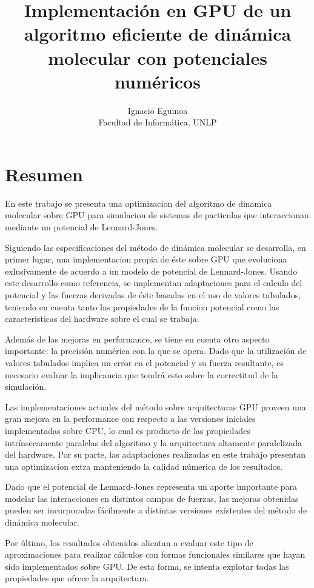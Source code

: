 \documentclass[a4paper,10pt]{report}
\title{Implementación en GPU de un algoritmo eficiente de dinámica molecular con potenciales numéricos}
\author{Ignacio Eguinoa \\ 
\small Facultad de Informática, UNLP
\date{}
}
\begin{document}
\maketitle



\section*{Resumen} 



En este trabajo se presenta una optimizacion del algoritmo de dinamica molecular sobre GPU para simulacion de sistemas de particulas que interaccionan mediante un potencial de Lennard-Jones. 

Siguiendo las especificaciones del método de dinámica molecular se desarrolla, en primer lugar, una implementacion propia de éste sobre GPU que evoluciona exlusivamente de acuerdo a un modelo de potencial de Lennard-Jones. Usando este desarrollo como referencia, se implementan adaptaciones para el calculo del potencial y las fuerzas derivadas de éste basadas en el uso de valores tabulados, teniendo en cuenta tanto las propiedades de la funcion potencial como las caracteristicas del hardware sobre el cual se trabaja.

Además de las mejoras en performance, se tiene en cuenta otro aspecto importante: la precisión numérica con la que se opera. Dado que la utilización de valores tabulados implica un error en el potencial y su fuerza resultante, es necesario evaluar la implicancia que tendrá esto sobre la correctitud de la simulación.

Las implementaciones actuales del método sobre arquitecturas GPU proveen una gran mejora en la performance con respecto a las versiones iniciales implementadas sobre CPU, lo cual es producto de las propiedades intrínsecamente paralelas del algoritmo y la arquitectura altamente paralelizada del hardware. Por su parte, las adaptaciones realizadas en este trabajo presentan una optimizacion extra manteniendo la calidad númerica de los resultados. 

Dado que el potencial de Lennard-Jones representa un aporte importante para modelar las interacciones en distintos campos de fuerzas, las mejoras obtenidas pueden ser incorporadas fácilmente a distintas versiones existentes del método de dinámica molecular. 

Por último, los resultados obtenidos alientan a evaluar este tipo de aproximaciones para realizar cálculos con formas funcionales similares que hayan sido implementados sobre GPU. De esta forma, se intenta explotar todas las propiedades que ofrece la arquitectura.
\end{document}
